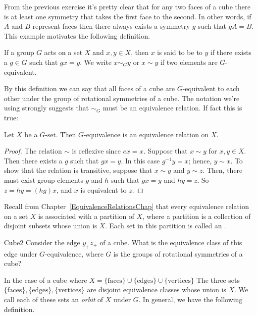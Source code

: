 From the previous exercise it's pretty clear that for any two faces of a cube there is at least one symmetry that takes the first face to the second.  In other words, if $A$ and $B$ represent faces then there always exists a symmetry $g$ such that $gA=B$.  This example motivates the following definition.

\begin{defn}\label{GEquivalent}
If a group $G$ acts on a set $X$ and $x, y \in X$, then $x$ is said to be
 to $y$ if there exists a
$g \in G$ such that $gx =y$. We write $x \sim_Gy$ or $x \sim y$ if
two elements are $G$-equivalent.
\end{defn}
By this definition we can say that all faces of a cube are $G$-equivalent to each other under the group of rotational symmetries of a cube.
The notation we're using strongly suggests that $\sim_G$ must be an equivalence relation.  If fact this is true:

\begin{thm}
Let $X$ be a $G$-set. Then $G$-equivalence is an equivalence relation
on $X$. 
\end{thm}
\begin{proof}
The relation $\sim$ is reflexive since $ex = x$. Suppose that $x \sim
y$ for $x, y \in X$. Then there exists a $g$ such that $gx = y$. In
this case $g^{-1}y=x$; hence, $y \sim x$. To show that the relation is
transitive, suppose that $x \sim y$ and $y \sim z$. Then, there must
exist group elements $g$ and $h$ such that $gx = y$ and $hy= z$. So $z
= hy = (hg)x$, and $x$ is equivalent to $z$.
\end{proof}

Recall from Chapter~\ref{EquivalenceRelationsChap} that every equivalence relation on a set $X$ is associated with a partition of $X$, where a partition is a collection of disjoint subsets whose union is $X$. Each set in this partition is called an .

\begin {exercise}{Cube2}
Consider the edge $\overline{y_+z_+}$ of a cube.  What is the equivalence class of this edge under $G$-equivalence, where $G$ is the groups of rotational symmetries of a cube?
\end {exercise}

In the case of a cube where $X=\{\text{faces}\}\cup\{\text{edges}\}\cup\{\text{vertices}\}$ The three sets $\{\text{faces}\},\{\text{edges}\},\{\text{vertices}\}$ are disjoint equivalence classes whose union is $X$. We call each of these sets an \emph{orbit} of $X$ under $G$.  In general, we have the following definition.

